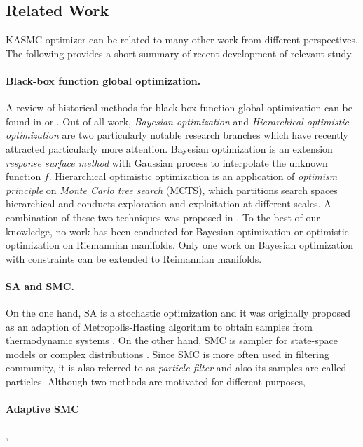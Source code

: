 \documentclass{article}
\begin{document}
\subsection{Related Work}
KASMC optimizer can be related to many other work from different perspectives. The following provides a short summary of recent development of relevant study. 
\paragraph{Black-box function global optimization.} A review of historical methods for black-box function global optimization can be found in 
\cite{black_box_optimization} or \cite{black_box_optimization_book}.   
Out of all work, \emph{Bayesian optimization} \citep{BO_tutorial,BO_NIPS} 
and \emph{Hierarchical optimistic optimization} \citep{optimistic}
are two particularly notable research branches which have recently attracted particularly more attention.  
Bayesian optimization is an extension \emph{response surface method} with Gaussian process to interpolate  
the unknown function $f$. Hierarchical optimistic optimization is an application of \emph{optimism principle} on 
\emph{Monte Carlo tree search} (MCTS), which partitions search spaces hierarchical and conducts exploration and 
exploitation at different scales. A combination of these two techniques was proposed in \cite{Bam_SOO}. 
To the best of our knowledge, no work has been conducted for Bayesian optimization or optimistic optimization on Riemannian 
manifolds. Only one work on Bayesian optimization with constraints \citep{BO_constraint} can be extended to Reimannian manifolds.        

\paragraph{SA and SMC.} On the one hand, SA is a stochastic optimization and it was originally proposed as an adaption of Metropolis-Hasting algorithm to obtain samples 
from thermodynamic systems \citep{SA}.  On the other hand, SMC is sampler for state-space models or complex distributions \citep{SMC}. 
Since SMC is more often used in filtering 
community, it is also referred to as \emph{particle filter} and also its samples are called particles.  
Although two methods are motivated for different purposes,  

\paragraph{Adaptive SMC}
\citep{SMC_ABC, ASMC_1, ASMC_binary}, 
\end{document}
